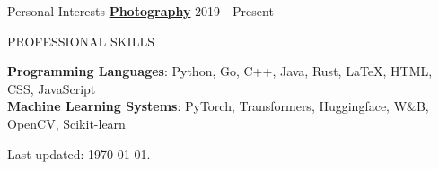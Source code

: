 \documentclass{resume}
\begin{document}
    

    


    \begin{rSection}{Personal Interests}
     \small{   
    \href{https://bingqi-shang.com/photography/}{\textbf{\textcolor{BS_color}{Photography}}} \hfill 2019 - Present
        }
    \end{rSection}

    \begin{rSection}{PROFESSIONAL SKILLS}

    \small{
    \textbf{Programming Languages}: Python, Go, C++, Java, Rust, \LaTeX, HTML, CSS, JavaScript
    \\ \textbf{Machine Learning Systems}: PyTorch, Transformers, Huggingface, W\&B, OpenCV, Scikit-learn
    }
    
    \end{rSection}


    
    \vspace*{\fill}
    \begin{flushleft}
        Last updated: \today.
    \end{flushleft}
\end{document}
